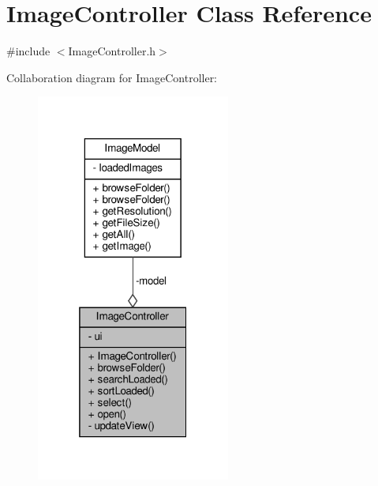 \hypertarget{classImageController}{}\section{Image\+Controller Class Reference}
\label{classImageController}


{\ttfamily \#include $<$Image\+Controller.\+h$>$}



Collaboration diagram for Image\+Controller\+:\nopagebreak
\begin{figure}[H]
\begin{center}
\leavevmode
\includegraphics[width=181pt]{classImageController__coll__graph}
\end{center}
\end{figure}
